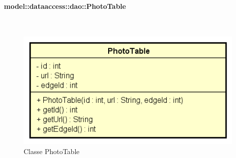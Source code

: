 \documentclass[../DefinizioneDiProdotto.tex]{subfiles}
\begin{document}
\paragraph{model::dataaccess::dao::PhotoTable}
\
\begin{figure}[H]
	\centering
	\includegraphics[width=\maxwidth]{img/PhotoTable.png}
	\caption{Classe PhotoTable}\label{fig:model::dataaccess::dao::PhotoTable} 
\end{figure}
\end{document}
